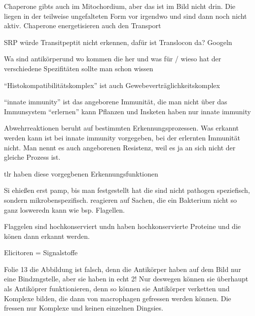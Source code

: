 

Chaperone gibts auch im Mitochordium, aber das ist im Bild nicht drin.
Die liegen in der teilweise ungefalteten Form vor irgendwo und sind dann noch nicht aktiv.
Chaperone energetisieren auch den Transport

SRP würde Transitpeptit nicht erkennen, dafür ist Translocon da? Googeln

Wa sind antikörperund wo kommen die her und was für / wieso hat der verschiedene Spezifitäten sollte man schon wissen

``Histokompatibilitätskomplex'' ist auch Gewebeverträglichkeitskomplex



``innate immunity'' ist das angeborene Immunität, die man nicht über das Immunsystem ``erlernen'' kann
Pflanzen und Insketen haben nur innate immunity

Abwehrreaktionen beruht auf bestimmten Erkennungsprozessen. Was erkannt werden kann ist bei innate immunity
vorgegeben, bei der erlernten Immunität nicht. Man nennt es auch angeborenen Resistenz, weil es ja an sich nicht der
gleiche Prozess ist.


tlr haben diese vorgegbenen Erkennungsfunktionen

Si ehießen erst pamp, bis man festgestellt hat die sind nicht pathogen speziefisch, sondern mikrobenspezifisch.
reagieren auf Sachen, die ein Bakterium nicht so ganz losweredn kann wie bsp. Flagellen.

Flaggelen sind hochkonserviert undn haben hochkonservierte Proteine und die könen dann erkannt werden.



Elicitoren = Signalstoffe


Folie 13 die Abbildung ist falsch, denn die Antikörper haben auf dem Bild nur eine Bindzngstelle, aber sie haben in
echt 2!
Nur deswegen können sie überhaupt als Antiköprer funktionieren, denn so können sie Antikörper verketten und
Komplexe bilden, die dann von \gls{macrophage}n gefressen werden können.
Die fressen nur Komplexe und keinen einzelnen Dingsies.

